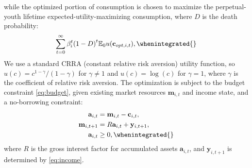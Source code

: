 \documentclass[\latexroot/\projectname]{subfiles}
\begin{document}
while the optimized portion of consumption is chosen to maximize the perpetual-youth lifetime expected-utility-maximizing consumption, where $D$ is the death probability:
\begin{equation}
  \begin{gathered}
    \begin{aligned}
      \sum_{t=0}^{\infty}\beta_i^t {(1-D)}^t \mathbb{E}_0 u(\mathbf{c}_{opt,i,t}),
      \whenintegrated{\label{eq:utility}} %
    \end{aligned}
  \end{gathered}
\end{equation}
We use a standard CRRA (constant relative risk aversion) utility function, so $u(c) = c^{1-\gamma}/(1-\gamma)$ for $\gamma \neq 1$ and $u(c) = \log(c)$ for $\gamma=1$, where $\gamma$ is the coefficient of relative risk aversion.
The optimization is subject to the budget constraint \eqref{eq:budget}, given existing market resources $\mathbf{m}_{i,t}$ and income state, and a no-borrowing constraint:
\begin{equation}
  \begin{gathered}
    \begin{aligned}
      \mathbf{a}_{i,t}   & = \mathbf{m}_{i,t} - \mathbf{c}_{i,t},     \\
      \mathbf{m}_{i,t+1} & = R \mathbf{a}_{i,t} + \mathbf{y}_{i,t+1}, \\
      \mathbf{a}_{i,t}   & \geq 0,
      \whenintegrated{\label{eq:budget}} %
    \end{aligned}
  \end{gathered}
\end{equation}
where $R$ is the gross interest factor for accumulated assets $\mathbf{a}_{i,t}$, and $\mathbf{y}_{i,t+1}$ is determined by \eqref{eq:income}.
\end{document}
